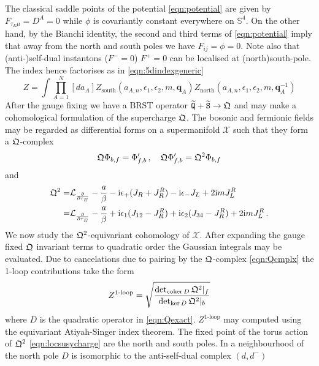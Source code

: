 \documentclass[main.tex]{subfiles}
\begin{document}
The classical saddle points of the potential \eqref{eqn:potential} are given by $F_{\tau_E\mu}=D^A=0$ while $\phi$ is covariantly constant everywhere on $\mathbb{S}^4$. On the other hand, by the Bianchi identity, the second and third terms of \eqref{eqn:potential} imply that away from the north and south poles we have $F_{ij}=\phi=0$. Note also that (anti-)self-dual instantons ($F^-=0$) $F^+=0$ can be localised at (north)south-pole. The index hence factorises as in \eqref{eqn:5dindexgeneric}
\begin{equation}
Z=\int\prod_{A=1}^N\left[da_A\right]Z_{\text{south}}\left(a_{A,n},\epsilon_1,\epsilon_2,m,\mathbf{q}_A\right)Z_{\text{north}}\left(a_{A,n},\epsilon_1,\epsilon_2,m,\mathbf{q}_A^{-1}\right)
\end{equation}
After the gauge fixing we have a BRST operator $\widetilde{\mathtt{Q}}+\widetilde{\mathtt{S}}\to\mathfrak{Q}$ and may make a cohomological formulation of the supercharge $\mathfrak{Q}$. The bosonic and fermionic fields may be regarded as differential forms on a supermanifold $\mathcal{X}$ such that they form a $\mathfrak{Q}$-complex
\begin{equation}\label{eqn:Qcmplx}
\mathfrak{Q}\Phi_{b,f}=\Phi_{f,b}'\,,\quad \mathfrak{Q}\Phi'_{f,b}=\mathfrak{Q}^2\Phi_{b,f}
\end{equation}
and
\begin{equation}\label{eqn:locsusycharge}
\begin{aligned}
\mathfrak{Q}^2=&\mathcal{L}_{\frac{\partial}{\partial\tau_E}}- \frac{a}{\beta}-\mathrm{i}\epsilon_+(J_R+J_R^R)-\mathrm{i}\epsilon_-J_L+2\mathrm{i} mJ_L^R\\
=&\mathcal{L}_{\frac{\partial}{\partial\tau_E}}- \frac{a}{\beta}+\mathrm{i}\epsilon_1(J_{12}-J_{R}^R)+\mathrm{i}\epsilon_2(J_{34}-J_{R}^R)+2\mathrm{i} m J_L^R\,.
\end{aligned}
\end{equation}
We now study the $\mathfrak{Q}^2$-equivariant cohomology of $\mathcal{X}$. After expanding the gauge fixed $\mathfrak{Q}$ invariant terms to quadratic order the Gaussian integrals may be evaluated. Due to cancelations due to pairing by the $\mathfrak{Q}$-complex \eqref{eqn:Qcmplx} the 1-loop contributions take the form \cite{Kim:2012gu}
\begin{equation}
Z^{\text{1-loop}}=\sqrt{\frac{\det_{\operatorname{coker} D}\mathfrak{Q}^2|_{f}}{\det_{\ker D}\mathfrak{Q}^2|_{b}}}
\end{equation}
where $D$ is the quadratic operator in \eqref{eqn:Qexact}. $Z^{\text{1-loop}}$ may computed using the equivariant Atiyah-Singer index theorem. The fixed point of the torus action of $\mathfrak{Q}^2$ \eqref{eqn:locsusycharge} are the north and south poles. In a neighbourhood of the north pole $D$ is isomorphic to the anti-self-dual complex $(d,d^-)$
\end{document}

